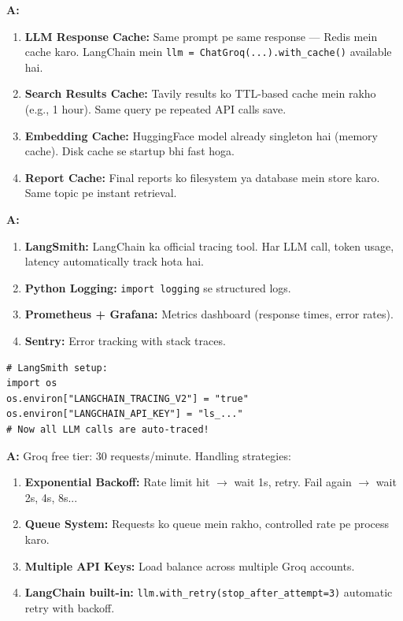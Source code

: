 \documentclass[12pt, a4paper]{article}
\begin{document}
\begin{interviewbox}[title={\faIcon{user-tie} ~Q39: Caching strategy kya hogi?}]
\textbf{A:}
\begin{enumerate}
\item \textbf{LLM Response Cache:} Same prompt pe same response --- Redis mein cache karo. LangChain mein \texttt{llm = ChatGroq(...).with\_cache()} available hai.
\item \textbf{Search Results Cache:} Tavily results ko TTL-based cache mein rakho (e.g., 1 hour). Same query pe repeated API calls save.
\item \textbf{Embedding Cache:} HuggingFace model already singleton hai (memory cache). Disk cache se startup bhi fast hoga.
\item \textbf{Report Cache:} Final reports ko filesystem ya database mein store karo. Same topic pe instant retrieval.
\end{enumerate}
\end{interviewbox}

\begin{interviewbox}[title={\faIcon{user-tie} ~Q40: Monitoring aur logging kaise karenge production mein?}]
\textbf{A:}
\begin{enumerate}
\item \textbf{LangSmith:} LangChain ka official tracing tool. Har LLM call, token usage, latency automatically track hota hai.
\item \textbf{Python Logging:} \texttt{import logging} se structured logs.
\item \textbf{Prometheus + Grafana:} Metrics dashboard (response times, error rates).
\item \textbf{Sentry:} Error tracking with stack traces.
\end{enumerate}
\begin{lstlisting}[style=pythonstyle]
# LangSmith setup:
import os
os.environ["LANGCHAIN_TRACING_V2"] = "true"
os.environ["LANGCHAIN_API_KEY"] = "ls_..."
# Now all LLM calls are auto-traced!
\end{lstlisting}
\end{interviewbox}

\begin{interviewbox}[title={\faIcon{user-tie} ~Q41: Rate limiting kaise handle karenge?}]
\textbf{A:} Groq free tier: 30 requests/minute. Handling strategies:
\begin{enumerate}
\item \textbf{Exponential Backoff:} Rate limit hit $\rightarrow$ wait 1s, retry. Fail again $\rightarrow$ wait 2s, 4s, 8s...
\item \textbf{Queue System:} Requests ko queue mein rakho, controlled rate pe process karo.
\item \textbf{Multiple API Keys:} Load balance across multiple Groq accounts.
\item \textbf{LangChain built-in:} \texttt{llm.with\_retry(stop\_after\_attempt=3)} automatic retry with backoff.
\end{enumerate}
\end{interviewbox}
\end{document}
